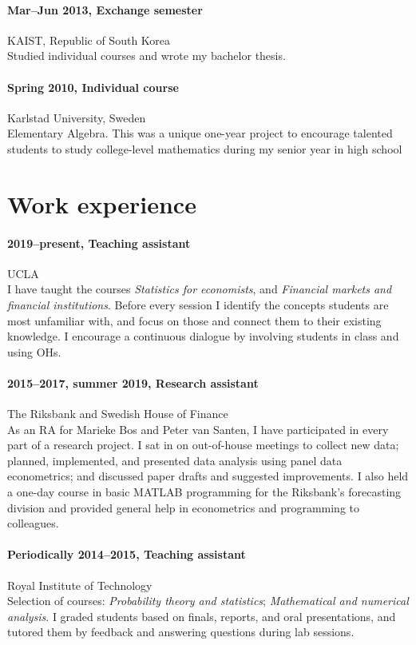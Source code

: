 \documentclass[letterpaper,10pt]{article}
\begin{document}
\paragraph{Mar--Jun 2013, Exchange semester}\hfill KAIST, Republic of South Korea\\
Studied individual courses and wrote my bachelor thesis.


\paragraph{Spring 2010, Individual course}\hfill Karlstad University, Sweden\\
Elementary Algebra. This was a unique one-year project to encourage talented students to study college-level mathematics during my senior year in high school

\section*{Work experience}
\paragraph{2019--present, Teaching assistant}\hfill UCLA\\
I have taught the courses \emph{Statistics for economists}, and \emph{Financial markets and financial institutions}. Before every session I identify the concepts students are most unfamiliar with, and focus on those and connect them to their existing knowledge. I encourage a continuous dialogue by involving students in class and using OHs.

\paragraph{2015--2017, summer 2019, Research assistant}\hfill The Riksbank and Swedish House of Finance\\
As an RA for Marieke Bos and Peter van Santen, I have participated in every part of a research project. I sat in on out-of-house meetings to collect new data; planned, implemented, and presented data analysis using panel data econometrics; and discussed paper drafts and suggested improvements. I also held a one-day course in basic MATLAB programming for the Riksbank's forecasting division and provided general help in econometrics and programming to colleagues.

\paragraph{Periodically 2014--2015, Teaching assistant}
\hfill Royal Institute of Technology\\
Selection of courses: \emph{Probability theory and statistics}; \emph{Mathematical and numerical analysis}. I graded students based on finals, reports, and oral presentations, and tutored them by feedback and answering questions during lab sessions.
\end{document}
